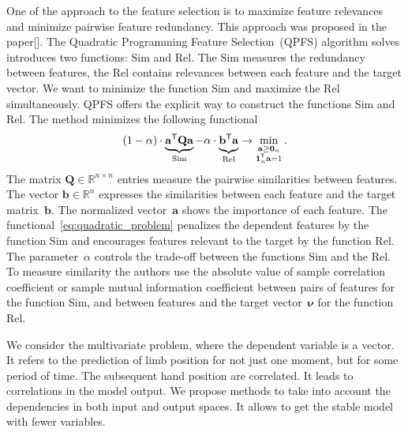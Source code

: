 \documentclass[12pt,twoside]{article}
\theoremstyle{definition}
\newcommand{\ba}{\mathbf{a}}
\newcommand{\bb}{\mathbf{b}}
\newcommand{\bQ}{\mathbf{Q}}
\newcommand{\bbR}{\mathbb{R}}
\newcommand{\T}{\mathsf{T}}
\newcommand{\bnu}{\boldsymbol{\nu}}
\newcommand{\bOne}{\boldsymbol{1}}
\newcommand{\bZero}{\boldsymbol{0}}
\begin{document}
One of the approach to the feature selection is to maximize feature relevances and minimize pairwise feature redundancy. This approach was proposed in the paper[].
The Quadratic Programming Feature Selection~(QPFS) algorithm solves introduces two functions: $\text{Sim}$ and $\text{Rel}$.
The $\text{Sim}$ measures the redundancy between features, the $\text{Rel}$ contains relevances between each feature and the target vector.
We want to minimize the function Sim and maximize the Rel simultaneously.
QPFS offers the explicit way to construct the functions Sim and Rel.
The method minimizes the following functional
\begin{equation}
(1 - \alpha) \cdot \underbrace{\ba^{\T} \bQ \ba}_{\text{Sim}} - \alpha \cdot \underbrace{\vphantom{()} \bb^{\T} \ba}_{\text{Rel}} \rightarrow \min_{\substack{\ba \geq \bZero_n \\ \bOne_n^{\T} \ba=1}}.
\label{eq:quadratic_problem}
\end{equation}
The matrix $\bQ \in \bbR^{n \times n}$ entries measure the pairwise similarities between features.
The vector $\bb \in \bbR^n$ expresses the similarities between each feature and the target matrix~$\bb$.
The normalized vector~$\ba$ shows the importance of each feature.
The functional~\eqref{eq:quadratic_problem} penalizes the dependent features by the function Sim and encourages features relevant to the target by the function Rel.
The parameter~$\alpha$ controls the trade-off between the functions Sim and the Rel.
To measure similarity the authors use the absolute value of sample correlation coefficient or sample mutual information coefficient between pairs of features for the function Sim, and between features and the target vector~$\bnu$ for the function Rel.

We consider the multivariate problem, where the dependent variable is a vector. 
It refers to the prediction of limb position for not just one moment, but for some period of time. The subsequent hand position are correlated. 
It leads to correlations in the model output. 
We propose methods to take into account the dependencies in both input and output spaces. 
It allows to get the stable model with fewer variables.

\end{document}
